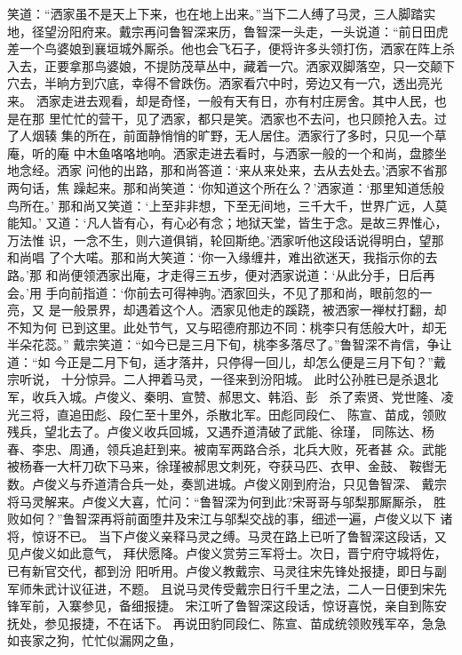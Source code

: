 笑道：“洒家虽不是天上下来，也在地上出来。”当下二人缚了马灵，三人脚踏实
地，径望汾阳府来。戴宗再问鲁智深来历，鲁智深一头走，一头说道：“前日田虎
差一个鸟婆娘到襄垣城外厮杀。他也会飞石子，便将许多头领打伤，洒家在阵上杀
入去，正要拿那鸟婆娘，不提防茂草丛中，藏着一穴。洒家双脚落空，只一交颠下
穴去，半晌方到穴底，幸得不曾跌伤。洒家看穴中时，旁边又有一穴，透出亮光来。
洒家走进去观看，却是奇怪，一般有天有日，亦有村庄房舍。其中人民，也是在那
里忙忙的营干，见了洒家，都只是笑。洒家也不去问，也只顾抢入去。过了人烟辏
集的所在，前面静悄悄的旷野，无人居住。洒家行了多时，只见一个草庵，听的庵
中木鱼咯咯地响。洒家走进去看时，与洒家一般的一个和尚，盘膝坐地念经。洒家
问他的出路，那和尚答道：‘来从来处来，去从去处去。’洒家不省那两句话，焦
躁起来。那和尚笑道：‘你知道这个所在么？’洒家道：‘那里知道恁般鸟所在。’
那和尚又笑道：‘上至非非想，下至无间地，三千大千，世界广远，人莫能知。’
又道：‘凡人皆有心，有心必有念；地狱天堂，皆生于念。是故三界惟心，万法惟
识，一念不生，则六道俱销，轮回斯绝。’洒家听他这段话说得明白，望那和尚唱
了个大喏。那和尚大笑道：‘你一入缘缠井，难出欲迷天，我指示你的去路。’那
和尚便领洒家出庵，才走得三五步，便对洒家说道：‘从此分手，日后再会。’用
手向前指道：‘你前去可得神驹。’洒家回头，不见了那和尚，眼前忽的一亮，又
是一般景界，却遇着这个人。洒家见他走的蹊跷，被洒家一禅杖打翻，却不知为何
已到这里。此处节气，又与昭德府那边不同：桃李只有恁般大叶，却无半朵花蕊。”
戴宗笑道：“如今已是三月下旬，桃李多落尽了。”鲁智深不肯信，争让道：“如
今正是二月下旬，适才落井，只停得一回儿，却怎么便是三月下旬？”戴宗听说，
十分惊异。二人押着马灵，一径来到汾阳城。
此时公孙胜已是杀退北军，收兵入城。卢俊义、秦明、宣赞、郝思文、韩滔、彭，
杀了索贤、党世隆、凌光三将，直追田彪、段仁至十里外，杀散北军。田彪同段仁、
陈宣、苗成，领败残兵，望北去了。卢俊义收兵回城，又遇乔道清破了武能、徐瑾，
同陈达、杨春、李忠、周通，领兵追赶到来。被南军两路合杀，北兵大败，死者甚
众。武能被杨春一大杆刀砍下马来，徐瑾被郝思文刺死，夺获马匹、衣甲、金鼓、
鞍辔无数。卢俊义与乔道清合兵一处，奏凯进城。卢俊义刚到府治，只见鲁智深、
戴宗将马灵解来。卢俊义大喜，忙问：“鲁智深为何到此?宋哥哥与邬梨那厮厮杀，
胜败如何？”鲁智深再将前面堕井及宋江与邬梨交战的事，细述一遍，卢俊义以下
诸将，惊讶不已。
当下卢俊义亲释马灵之缚。马灵在路上已听了鲁智深这段话，又见卢俊义如此意气，
拜伏愿降。卢俊义赏劳三军将士。次日，晋宁府守城将佐，已有新官交代，都到汾
阳听用。卢俊义教戴宗、马灵往宋先锋处报捷，即日与副军师朱武计议征进，不题。
且说马灵传受戴宗日行千里之法，二人一日便到宋先锋军前，入寨参见，备细报捷。
宋江听了鲁智深这段话，惊讶喜悦，亲自到陈安抚处，参见报捷，不在话下。
再说田豹同段仁、陈宣、苗成统领败残军卒，急急如丧家之狗，忙忙似漏网之鱼，

